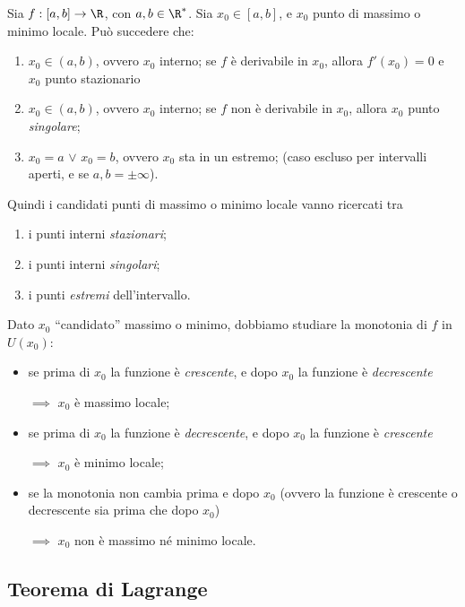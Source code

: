 Sia $ f:[a, b]\to \R $, con $ a, b \in \R^{*} $. Sia $ x_0 \in [a,b] $, e $ x_0 $ punto di massimo o minimo locale. Può succedere che:
\begin{enumerate}
    \item $ x_0 \in (a,b)$, ovvero $ x_0 $ interno; se $ f $ è derivabile in $ x_0 $, allora $ f'(x_0)=0$ e $ x_0 $ punto stazionario
    \item $ x_0 \in (a,b)$, ovvero $ x_0 $ interno; se $ f $ non è derivabile in $ x_0 $, allora $ x_0 $ punto \textit{singolare};
    \item $ x_0=a $ $ \lor $ $ x_0=b $, ovvero $ x_0 $ sta in un estremo; (caso escluso per intervalli aperti, e se $ a,b=\pm \infty $).
\end{enumerate}
Quindi i candidati punti di massimo o minimo locale vanno ricercati tra \begin{enumerate}
    \item i punti interni \textit{stazionari};
    \item i punti interni \textit{singolari};
    \item i punti \textit{estremi} dell'intervallo.
\end{enumerate}
Dato $ x_0 $ ``candidato'' massimo o minimo, dobbiamo studiare la monotonia di $ f $ in $ U(x_0) $: \begin{itemize}
    \item se prima di $ x_0 $ la funzione è \textit{crescente}, e dopo $ x_0 $ la funzione è \textit{decrescente} 
    
    $\implies$ $ x_0 $ è massimo locale;
    \item se prima di $ x_0 $ la funzione è \textit{decrescente}, e dopo $ x_0 $ la funzione è \textit{crescente} 
    
    $\implies$ $ x_0 $ è minimo locale;
    \item se la monotonia non cambia prima e dopo $ x_0 $ (ovvero la funzione è crescente o decrescente sia prima che dopo $ x_0 $) 
    
    $\implies$ $ x_0 $ non è massimo né minimo locale.
\end{itemize}

\subsection{Teorema di Lagrange}

